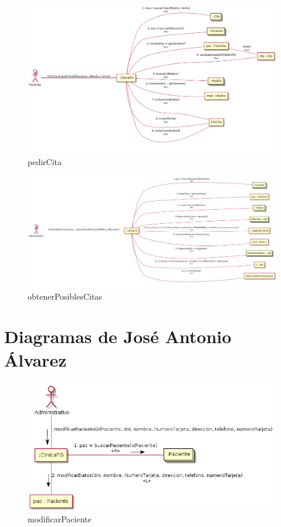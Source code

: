 \documentclass[11pt,a4paper]{article}
\begin{document}
\begin{figure}[H]
	\caption{pedirCita}
	\centering
	\includegraphics[width=\textwidth,height=\textheight,keepaspectratio]{Diagramas/pedircita}
\end{figure}

\begin{figure}[H]
	\caption{obtenerPosiblesCitas}
	\centering
	\includegraphics[width=\textwidth,height=\textheight,keepaspectratio]{Diagramas/obtenerposiblescitas}
\end{figure}

\section{Diagramas de José Antonio Álvarez}

\begin{figure}[H]
	\caption{modificarPaciente}
	\centering
	\includegraphics[width=\textwidth,height=\textheight,keepaspectratio]{Diagramas/modificarPaciente}
\end{figure}
\end{document}
